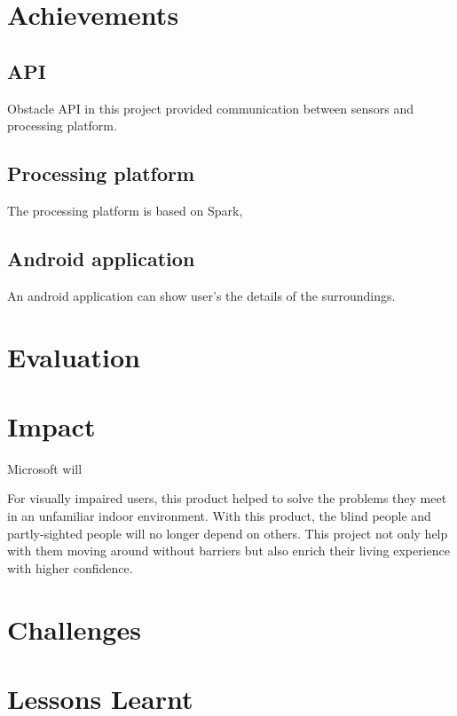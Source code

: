 \documentclass[prodmode,acmtosem]{acmsmall} %
\begin{document}
\section{Achievements}
\subsection{API}
Obstacle API in this project provided communication between sensors and processing platform. 
\subsection{Processing platform}
The processing platform is based on Spark, 
\subsection{Android application}
An android application can show user's the details of the surroundings.
\section{Evaluation}
\section{Impact}
Microsoft will

For visually impaired users, this product helped to solve the problems they meet in an unfamiliar indoor environment. With this product, the blind people and partly-sighted people will no longer depend on others. This project not only help with them moving around without barriers but also enrich their living experience with higher confidence.
\section{Challenges}
\section{Lessons Learnt}
\end{document}
